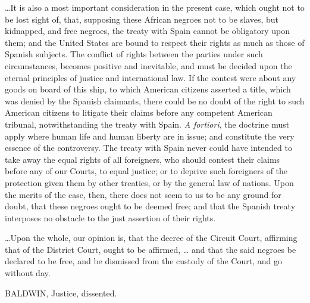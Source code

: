 {\dots}It is also a most important consideration in the present case, which
ought not to be lost sight of, that, supposing these African negroes not to be
slaves, but kidnapped, and free negroes, the treaty with Spain cannot be
obligatory upon them; and the United States are bound to respect their rights
as much as those of Spanish subjects. The conflict of rights between the
parties under such circumstances, becomes positive and inevitable, and must be
decided upon the eternal principles of justice and international law. If the
contest were about any goods on board of this ship, to which American citizens
asserted a title, which was denied by the Spanish claimants, there could be no
doubt of the right to such American citizens to litigate their claims before
any competent American tribunal, notwithstanding the treaty with Spain.
\textit{A fortiori}, the doctrine must apply where human life and human liberty
are in issue; and constitute the very essence of the controversy. The treaty
with Spain never could have intended to take away the equal rights of all
foreigners, who should contest their claims before any of our Courts, to equal
justice; or to deprive such foreigners of the protection given them by other
treaties, or by the general law of nations. Upon the merits of the case, then,
there does not seem to us to be any ground for doubt, that these negroes ought
to be deemed free; and that the Spanish treaty interposes no obstacle to the
just assertion of their rights.

{\dots}Upon the whole, our opinion is, that the decree of the Circuit Court,
affirming that of the District Court, ought to be affirmed, {\dots} and that
the said negroes be declared to be free, and be dismissed from the custody of
the Court, and go without day.

BALDWIN, Justice, dissented.

